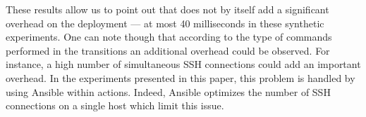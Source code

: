 These results allow us to point out that \mad does not by itself add a significant overhead on the deployment --- at most 40 milliseconds in these synthetic experiments. One can note though that according to the type of commands performed in the transitions  an additional overhead could be observed. For instance, a high number of simultaneous SSH connections could add an important overhead. In the experiments presented in this paper, this problem is handled by using Ansible within actions. Indeed, Ansible optimizes the number of SSH connections on a single host which limit this issue.


